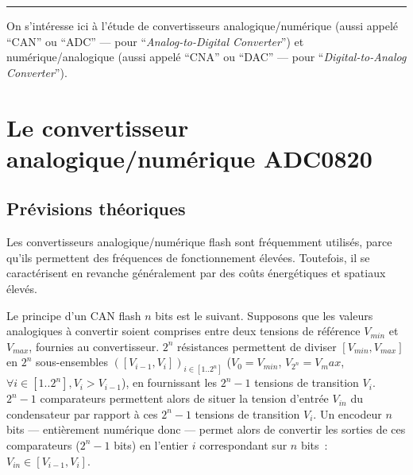 \documentclass{article}
\begin{document}


\vspace{5pt}\hrule\vspace{2pt}


\vspace{20pt}


On s'intéresse ici à l'étude de convertisseurs analogique/numérique (aussi appelé ``CAN'' ou ``ADC'' --- pour ``\textit{Analog-to-Digital Converter}'') et numérique/analogique (aussi appelé ``CNA'' ou ``DAC'' --- pour ``\textit{Digital-to-Analog Converter}'').

\section{Le convertisseur analogique/numérique ADC0820}
\label{sec:ADC0820}

\subsection{Prévisions théoriques}


Les convertisseurs analogique/numérique flash sont fréquemment utilisés, parce qu'ils permettent des fréquences de fonctionnement élevées. Toutefois, il se caractérisent en revanche généralement par des coûts énergétiques et spatiaux élevés.

Le principe d'un CAN flash $n$ bits est le suivant.
Supposons que les valeurs analogiques à convertir soient comprises entre deux tensions de référence $V_{min}$ et $V_{max}$, fournies au convertisseur. 
$2^n$ résistances permettent de diviser $[V_{min},V_{max}]$ en $2^n$ sous-ensembles $([V_{i-1},V_i])_{i\in[1..2^n]}$ ($V_0=V_{min}$, $V_{2^n}=V_max$, $\forall i\in[1..2^n], V_i> V_{i-1}$), en fournissant les $2^n-1$ tensions de transition $V_i$.
$2^n-1$ comparateurs permettent alors de situer la tension d'entrée $V_{in}$ du condensateur par rapport à ces $2^n-1$ tensions de transition $V_i$.
Un encodeur $n$ bits --- entièrement numérique donc --- permet alors de convertir les sorties de ces comparateurs ($2^n-1$ bits) en l'entier $i$ correspondant sur $n$ bits~: $V_{in}\in[V_{i-1},V_i]$.
\end{document}
